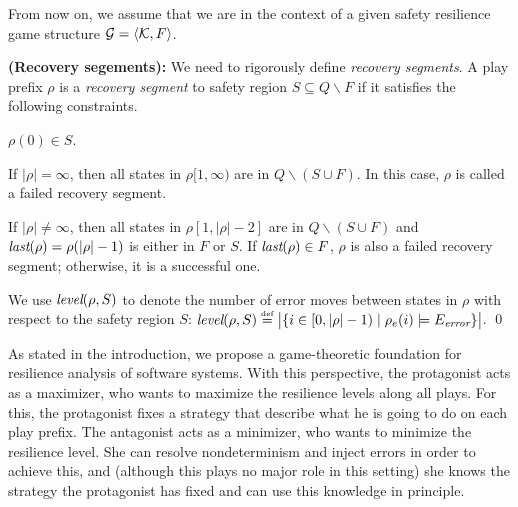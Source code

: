 From now on, we assume that we are in the context of a 
given safety resilience game structure ${\cal G}=\langle {\cal K},F\rangle$. 

\begin{definition}\label{def.rec.seg}
{\bf (Recovery segements):} 
We need to rigorously define {\em recovery segments}. 
A play prefix $\rho$ is a {\em recovery segment} to safety region $S\subseteq Q\smallsetminus F$ 
if it satisfies the following constraints. 
\begin{list1} 
\item %
      $\rho(0)\in S$. 
\item If $|\rho|=\infty$, then all states in $\rho[1,\infty)$ are 
  in $Q\smallsetminus(S\cup F)$. 
  In this case, $\rho$ is called a failed recovery segment. 
\item If $|\rho|\neq \infty$, then all states in $\rho[1,|\rho|-2]$ 
  are in $Q\smallsetminus(S\cup F)$ and 
  $\textit{last}(\rho)=\rho(|\rho|-1)$ is either in $F$ or $S$.    
  If $\textit{last}(\rho)\in F$, $\rho$ is also a failed recovery segment; 
  otherwise, it is a successful one. 
\end{list1} 
We use $\mbox{\em level}(\rho, S)$ to 
denote the number of error moves between states in $\rho$  
with respect to the safety region $S$:
$\mbox{\em level}(\rho, S) \stackrel{\mbox{\tiny def}}{=} \big\lvert\{i \in [0,|\rho|-1) \mid \rho_e(i) \models E_{\textit{error}}\}\big\rvert$.
\qed 
\end{definition} 

As stated in the introduction, we propose 
a game-theoretic foundation for resilience analysis of software systems. 
With this perspective, the protagonist acts as a maximizer, who wants to maximize the 
resilience levels along all plays.
For this, the protagonist fixes a strategy that describe what he is going to do on each play prefix.
The antagonist acts as a minimizer, who wants to minimize the resilience level.
She can resolve nondeterminism and inject errors in order to achieve this, and (although this plays no major role in this setting) she knows the strategy the protagonist has fixed and can use this knowledge in principle.


